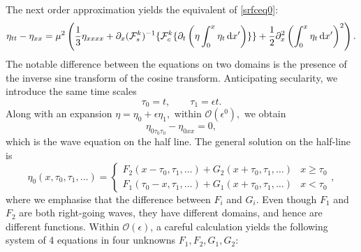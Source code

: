 \documentclass[11pt,reqno,oneside,a4paper]{article}
\begin{document}
The next order approximation yields the equivalent of \eqref{srfceq0}:
\begin{equation}\label{S5:SurfaceElevationHL}
 \eta_{tt} - \eta_{xx} = \mu^2 \left( \frac{1}{3} \eta_{xxxx}  + \partial_x(\mathcal{F}^k_s)^{-1} \{ \mathcal{F}^k_c \{ \partial_t \left( \eta \int^{x}_0\eta_{t} \,\mathrm{d} x' \right)\} \} + \frac{1}{2} \partial^2_x\left(\int^{x}_0\eta_{t} \,\mathrm{d} x' \right)^2\right).
\end{equation}
The notable difference between the equations on two domains is the presence of the inverse sine transform of the cosine transform. Anticipating secularity, we introduce the same time scales 
\[ \tau_0 = t, \qquad \tau_1 = \epsilon t.\]
Along with an expansion $\eta = \eta_0 + \epsilon \eta_1,$ within $\mathcal{O}(\epsilon^0),$ we obtain
\[ \eta_{0\tau_0 \tau_0} - \eta_{0xx} = 0,\]
which is the wave equation on the half line. The general solution on the half-line is 
\[ \eta_0(x, \tau_0, \tau_1, \ldots ) = \begin{cases} F_2(x-\tau_0, \tau_1, \ldots ) + G_2(x+\tau_0, \tau_1, \ldots) & x\geq \tau_0 \\ F_1(\tau_0-x, \tau_1, \ldots ) + G_1(x+\tau_0, \tau_1, \ldots) & x<\tau_0 \end{cases}, \]
where we emphasise that the difference between $F_i$ and $G_i.$ Even though $F_1$ and $F_2$ are both right-going waves, they have different domains, and hence are different functions. Within $\mathcal{O}(\epsilon)$, a careful calculation yields the following system of 4 equations in four unknowns $F_1, F_2, G_1, G_2:$
\end{document}
